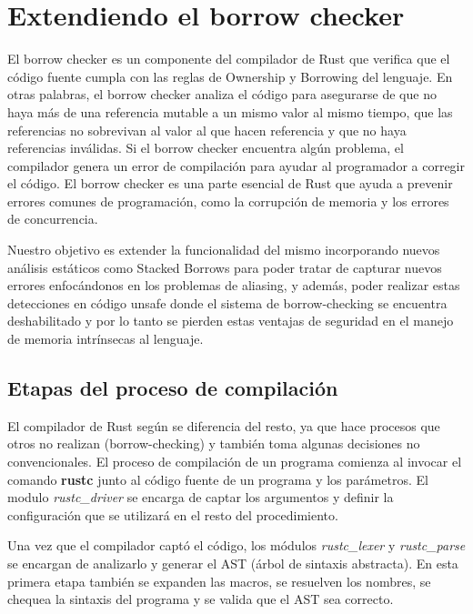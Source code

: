 \chapter{Extendiendo el borrow checker}

El borrow checker es un componente del compilador de Rust que verifica que el código fuente cumpla con las reglas de Ownership y Borrowing del lenguaje. En otras palabras, el borrow checker analiza el código para asegurarse de que no haya más de una referencia mutable a un mismo valor al mismo tiempo, que las referencias no sobrevivan al valor al que hacen referencia y que no haya referencias inválidas. Si el borrow checker encuentra algún problema, el compilador genera un error de compilación para ayudar al programador a corregir el código. El borrow checker es una parte esencial de Rust que ayuda a prevenir errores comunes de programación, como la corrupción de memoria y los errores de concurrencia.

Nuestro objetivo es extender la funcionalidad del mismo incorporando nuevos análisis estáticos como Stacked Borrows\cite{stackedborrows} para poder tratar de capturar nuevos errores enfocándonos en los problemas de aliasing, y además, poder realizar estas detecciones en código unsafe donde el sistema de borrow-checking se encuentra deshabilitado y por lo tanto se pierden estas ventajas de seguridad en el manejo de memoria intrínsecas al lenguaje.

\section{Etapas del proceso de compilación}

El compilador de Rust según \cite{rustcdevelopment} se diferencia del resto, ya que hace procesos que otros no realizan (borrow-checking) y también toma algunas decisiones no convencionales. El proceso de compilación de un programa comienza al invocar el comando \textbf{rustc} junto al código fuente de un programa y los parámetros. El modulo \textit{rustc\_driver} se encarga de captar los argumentos y definir la configuración que se utilizará en el resto del procedimiento.

Una vez que el compilador captó el código, los módulos \textit{rustc\_lexer} y \textit{rustc\_parse} se encargan de analizarlo y generar el AST (árbol de sintaxis abstracta). En esta primera etapa también se expanden las macros, se resuelven los nombres, se chequea la sintaxis del programa y se valida que el AST sea correcto.

